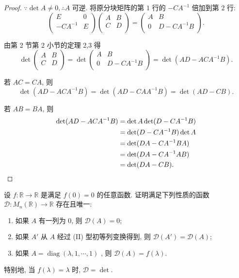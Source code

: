 \documentclass{ctexart}
\begin{document}
\begin{proof}
    $\because\det A\neq0,\therefore A$ 可逆. 将原分块矩阵的第 $1$ 行的 $-CA^{-1}$ 倍加到第 $2$ 行:
    \[\begin{pmatrix}
        E & 0 \\
        -CA^{-1} & E \\
    \end{pmatrix}\begin{pmatrix}
        A & B \\
        C & D \\
    \end{pmatrix}=\begin{pmatrix}
        A & B \\
        0 & D-CA^{-1}B \\
    \end{pmatrix}.\]

    由第 2 节第 2 小节的定理 2,3 得
    \[\det\begin{pmatrix}
        A & B \\
        C & D \\
    \end{pmatrix}=\det\begin{pmatrix}
        A & B \\
        0 & D-CA^{-1}B \\
    \end{pmatrix}=\det(AD-ACA^{-1}B).\]

    若 $AC=CA$, 则
    \[\det(AD-ACA^{-1}B)=\det(AD-CAA^{-1}B)=\det(AD-CB).\]

    若 $AB=BA$, 则
    \begin{align*}
        \det(AD-ACA^{-1}B) & =\det A\det(D-CA^{-1}B) \\
        & =\det(D-CA^{-1}B)\det A \\
        & =\det(DA-CA^{-1}BA) \\
        & =\det(DA-CA^{-1}AB) \\
        & =\det(DA-CB).\qedhere
    \end{align*}
\end{proof}
\begin{exercise}%
    设 $f:\mathbb{R}\to\mathbb{R}$ 是满足 $f(0)=0$ 的任意函数. 证明满足下列性质的函数 $\mathcal{D}:M_n(\mathbb{R})\to\mathbb{R}$ 存在且唯一:
    \begin{enumerate}
        \item 如果 $A$ 有一列为 $0$, 则 $\mathcal{D}(A)=0$;
        \item 如果 $A'$ 从 $A$ 经过 (II) 型初等列变换得到, 则 $\mathcal{D}(A')=\mathcal{D}(A)$;
        \item 如果 $A=\operatorname{diag}(\lambda,1,\cdots,1)$ , 则 $\mathcal{D}(A)=f(\lambda)$.
    \end{enumerate}

    特别地, 当 $f(\lambda)=\lambda$ 时, $\mathcal{D}=\det$.
\end{exercise}
\end{document}
